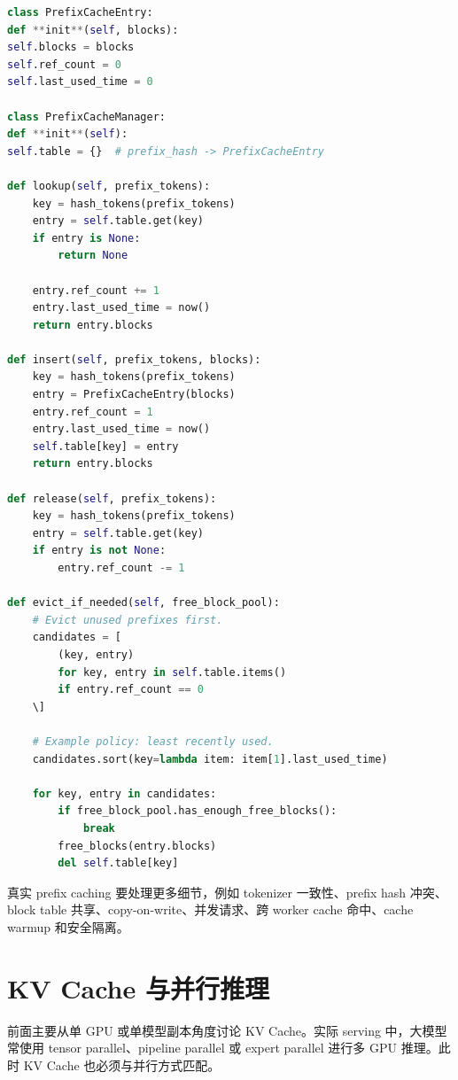\begin{lstlisting}[language=Python,caption={Prefix Cache 管理的极简伪代码},label={lst:prefix-cache-manager}]
class PrefixCacheEntry:
def **init**(self, blocks):
self.blocks = blocks
self.ref_count = 0
self.last_used_time = 0

class PrefixCacheManager:
def **init**(self):
self.table = {}  # prefix_hash -> PrefixCacheEntry

def lookup(self, prefix_tokens):
    key = hash_tokens(prefix_tokens)
    entry = self.table.get(key)
    if entry is None:
        return None

    entry.ref_count += 1
    entry.last_used_time = now()
    return entry.blocks

def insert(self, prefix_tokens, blocks):
    key = hash_tokens(prefix_tokens)
    entry = PrefixCacheEntry(blocks)
    entry.ref_count = 1
    entry.last_used_time = now()
    self.table[key] = entry
    return entry.blocks

def release(self, prefix_tokens):
    key = hash_tokens(prefix_tokens)
    entry = self.table.get(key)
    if entry is not None:
        entry.ref_count -= 1

def evict_if_needed(self, free_block_pool):
    # Evict unused prefixes first.
    candidates = [
        (key, entry)
        for key, entry in self.table.items()
        if entry.ref_count == 0
    \]

    # Example policy: least recently used.
    candidates.sort(key=lambda item: item[1].last_used_time)

    for key, entry in candidates:
        if free_block_pool.has_enough_free_blocks():
            break
        free_blocks(entry.blocks)
        del self.table[key]

\end{lstlisting}

真实 prefix caching 要处理更多细节，例如 tokenizer 一致性、prefix hash 冲突、block table 共享、copy-on-write、并发请求、跨 worker cache 命中、cache warmup 和安全隔离。

\section{KV Cache 与并行推理}
\label{sec:kv-cache-and-parallel-inference}

前面主要从单 GPU 或单模型副本角度讨论 KV Cache。实际 serving 中，大模型常使用 tensor parallel、pipeline parallel 或 expert parallel 进行多 GPU 推理。此时 KV Cache 也必须与并行方式匹配。

